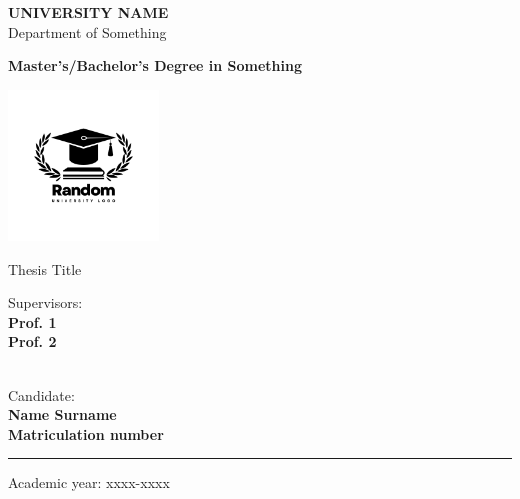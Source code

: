 

\begin{titlepage}
   \begin{center}
        \vspace*{1cm}
        
        \Large
        \textbf{UNIVERSITY NAME}\\ 
        Department of Something
        \vspace{0.5cm}
        
        \textbf{Master's/Bachelor's Degree in Something}
        \vspace{1cm}
        
        \includegraphics[width=0.3\textwidth]{frontmatter/logo.png}        
        \vspace{1cm}
        
        \LARGE
        Thesis Title
   \end{center}
   
    \vfill
    
   \begin{minipage}[t]{0.47\textwidth}
	{
        \large Supervisors:\\
        \textbf{Prof. 1}\\
        \textbf{Prof. 2}\\\\
        }
    \end{minipage}
    \hfill
    \begin{minipage}[t]{0.47\textwidth}\raggedleft
        \large Candidate:\\
        \textbf{Name Surname}\\
        \textbf{Matriculation number}
    \end{minipage}

\vfill
   \begin{center}    
        \par\noindent\rule{\textwidth}{0.8pt}
        Academic year: xxxx-xxxx
            
   \end{center}
\end{titlepage}

\restoregeometry